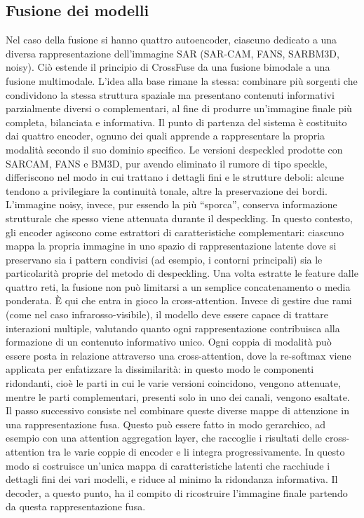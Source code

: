 \subsection{Fusione dei modelli}
Nel caso della fusione si hanno quattro autoencoder, ciascuno dedicato a una diversa rappresentazione dell’immagine SAR (SAR-CAM, FANS, SARBM3D, noisy).
Ciò estende il principio di CrossFuse da una fusione bimodale a una 
fusione multimodale. L’idea alla base rimane la stessa: combinare più sorgenti che condividono la stessa struttura spaziale ma presentano contenuti 
informativi parzialmente diversi o complementari, al fine di produrre un’immagine finale più completa, bilanciata e informativa.
Il punto di partenza del sistema è costituito dai quattro encoder, ognuno dei quali apprende a rappresentare la propria modalità secondo il 
suo dominio specifico. Le versioni despeckled prodotte con SARCAM, FANS e BM3D, pur avendo eliminato il rumore di tipo speckle, differiscono 
nel modo in cui trattano i dettagli fini e le strutture deboli: alcune tendono a privilegiare la continuità tonale, altre la preservazione 
dei bordi. L’immagine noisy, invece, pur essendo la più “sporca”, conserva informazione strutturale che spesso viene attenuata durante 
il despeckling. In questo contesto, gli encoder agiscono come estrattori di caratteristiche complementari: ciascuno mappa la propria immagine 
in uno spazio di rappresentazione latente dove si preservano sia i pattern condivisi (ad esempio, i contorni principali) sia le particolarità 
proprie del metodo di despeckling.
Una volta estratte le feature dalle quattro reti, la fusione non può limitarsi a un semplice concatenamento o media ponderata. È qui che 
entra in gioco la cross-attention. Invece di gestire due 
rami (come nel caso infrarosso-visibile), il modello deve essere capace di trattare interazioni multiple, valutando quanto ogni rappresentazione 
contribuisca alla formazione di un contenuto informativo unico. Ogni coppia di modalità può essere posta in relazione attraverso una cross-attention, 
dove la re-softmax viene applicata per enfatizzare la dissimilarità: in questo modo le componenti ridondanti, cioè le parti in cui le 
varie versioni coincidono, vengono attenuate, mentre le parti complementari, presenti solo in uno dei canali, vengono esaltate.
Il passo successivo consiste nel combinare queste diverse mappe di attenzione in una rappresentazione fusa. Questo può essere fatto in modo 
gerarchico, ad esempio con una attention aggregation layer, che raccoglie i risultati delle cross-attention tra le varie coppie di encoder e 
li integra progressivamente. In questo modo si costruisce un’unica mappa di caratteristiche latenti che racchiude i dettagli fini dei vari modelli, 
e riduce al minimo la ridondanza informativa.
Il decoder, a questo punto, ha il compito di ricostruire l’immagine finale partendo da questa rappresentazione fusa. 

